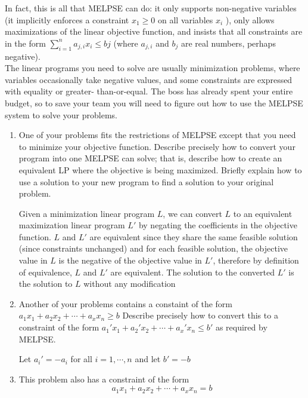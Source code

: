 \documentclass[11pt]{article}
\begin{document}
\begin{enumerate}
    In fact, this is all that MELPSE can do: it only supports non-negative variables (it implicitly enforces a constraint $x_1\geq 0$ on all variables $x_i$ ), only allows maximizations of the linear objective function, and insists that all constraints are in the form  $\sum_{i=1}^n a_{j,i} x_i \leq bj$ (where $a_{j,i}$ and $b_j$ are real numbers, perhaps negative). \\
    The linear programs you need to solve are usually minimization problems, where variables occasionally take negative values, and some constraints are expressed with equality or greater- than-or-equal. The boss has already spent your entire budget, so to save your team you will need to figure out how to use the MELPSE system to solve your problems.
    \begin{enumerate}
        \item One of your problems fits the restrictions of MELPSE except that you need to minimize your objective function. Describe precisely how to convert your program into one MELPSE can solve; that is, describe how to create an equivalent LP where the objective is being maximized. Briefly explain how to use a solution to your new program to find a solution to your original problem. 
        \begin{solution}
            Given a minimization linear program $L$, we can convert $L$ to an equivalent maximization linear program $L'$ by negating the coefficients in the objective function. $L$ and $L'$ are equivalent since they share the same feasible solution (since constraints unchanged) and for each feasible solution, the objective value in $L$ is the negative of the objective value in $L'$, therefore by definition of equivalence, $L$ and $L'$ are equivalent. The solution to the converted $L'$ is the solution to $L$ without any modification
        \end{solution}
        \item Another of your problems contains a constaint of the form $a_1 x_1 + a_2 x_2 + \cdots + a_x x_n \geq b$ Describe precisely how to convert this to a constraint of the form $a_1' x_1 + a_2' x_2 + \cdots + a_x' x_n \leq b'$ as required by MELPSE.
        \begin{solution}
            Let $a_i' = -a_i$ for all $i = 1, \cdots, n$ and let $b' = -b$
        \end{solution}
        \item This problem also has a constraint of the form
        \[
            a_1 x_1 + a_2 x_2 + \cdots + a_x x_n = b
        \]

\end{enumerate}
\end{enumerate}
\end{document}
